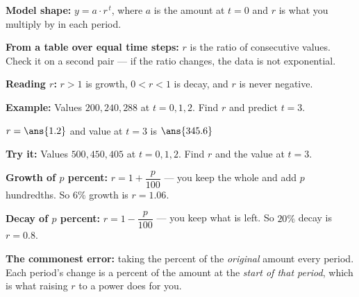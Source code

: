 \documentclass[12pt]{article}
\begin{document}


\begin{formulabox}
\textbf{Model shape:} $y = a \cdot r^{\,t}$, where $a$ is the amount at $t = 0$ and $r$ is what you multiply by in each period.\par
\textbf{From a table over equal time steps:} $r$ is the ratio of consecutive values. Check it on a second pair --- if the ratio changes, the data is not exponential.\par
\textbf{Reading $r$:} $r > 1$ is growth, $0 < r < 1$ is decay, and $r$ is never negative.
\end{formulabox}

\begin{examplebox}
\textbf{Example:} \quad Values $200, 240, 288$ at $t = 0, 1, 2$. Find $r$ and predict $t = 3$.

$r = \ans{1.2}$ \quad and \quad value at $t = 3$ is $\ans{345.6}$
\end{examplebox}

\begin{tryitbox}
\textbf{Try it:} \quad Values $500, 450, 405$ at $t = 0, 1, 2$. Find $r$ and the value at $t = 3$.\\[2pt]
\end{tryitbox}


\begin{formulabox}
\textbf{Growth of $p$ percent:} $r = 1 + \dfrac{p}{100}$ --- you keep the whole and add $p$ hundredths. So $6\%$ growth is $r = 1.06$.\par
\textbf{Decay of $p$ percent:} $r = 1 - \dfrac{p}{100}$ --- you keep what is left. So $20\%$ decay is $r = 0.8$.\par
\textbf{The commonest error:} taking the percent of the \emph{original} amount every period. Each period's change is a percent of the amount at the \emph{start of that period}, which is what raising $r$ to a power does for you.
\end{formulabox}
\end{document}
